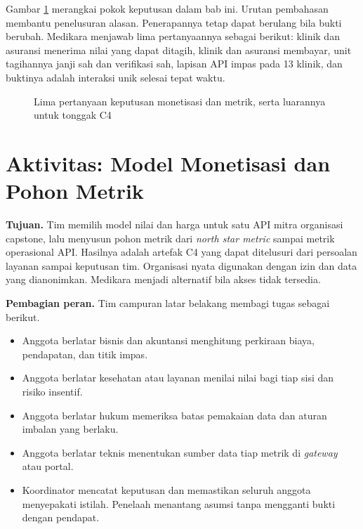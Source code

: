 Gambar \ref{fig:ch12-keputusan} merangkai pokok keputusan dalam bab ini. Urutan pembahasan membantu penelusuran alasan. Penerapannya tetap dapat berulang bila bukti berubah.
Medikara menjawab lima pertanyaannya sebagai berikut: klinik dan asuransi menerima nilai yang dapat ditagih, klinik dan asuransi membayar, unit tagihannya janji sah dan verifikasi sah,
lapisan API impas pada 13 klinik, dan buktinya adalah interaksi unik selesai tepat waktu.

\begin{figure}[!htb]
  \centering
  
  \caption{Lima pertanyaan keputusan monetisasi dan metrik, serta luarannya untuk tonggak C4}
  \label{fig:ch12-keputusan}
\end{figure}

\section{Aktivitas: Model Monetisasi dan Pohon Metrik}

\textbf{Tujuan.} Tim memilih model nilai dan harga untuk satu API mitra organisasi capstone, lalu menyusun pohon metrik dari \textit{north star metric} sampai metrik operasional API.
Hasilnya adalah artefak C4 yang dapat ditelusuri dari persoalan layanan sampai keputusan tim. Organisasi nyata digunakan dengan izin dan data yang dianonimkan. Medikara menjadi
alternatif bila akses tidak tersedia.

\textbf{Pembagian peran.} Tim campuran latar belakang membagi tugas sebagai berikut.
\begin{itemize}
  \item Anggota berlatar bisnis dan akuntansi menghitung perkiraan biaya, pendapatan, dan titik impas.
  \item Anggota berlatar kesehatan atau layanan menilai nilai bagi tiap sisi dan risiko insentif.
  \item Anggota berlatar hukum memeriksa batas pemakaian data dan aturan imbalan yang berlaku.
  \item Anggota berlatar teknis menentukan sumber data tiap metrik di \textit{gateway} atau portal.
  \item Koordinator mencatat keputusan dan memastikan seluruh anggota menyepakati istilah. Penelaah menantang asumsi tanpa mengganti bukti dengan pendapat.
\end{itemize}

